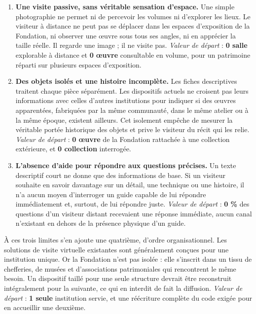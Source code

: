\begin{enumerate}
  \item \textbf{Une visite passive, sans véritable sensation d'espace.} Une
        simple photographie ne permet ni de percevoir les volumes ni d'explorer
        les lieux. Le visiteur à distance ne peut pas se déplacer dans les
        espaces d'exposition de la Fondation, ni observer une œuvre sous tous
        ses angles, ni en apprécier la taille réelle. Il regarde une image ; il
        ne visite pas. \emph{Valeur de départ} : \textbf{0 salle} explorable à
        distance et \textbf{0 œuvre} consultable en volume, pour un patrimoine
        réparti sur plusieurs espaces d'exposition.

  \item \textbf{Des objets isolés et une histoire incomplète.} Les fiches
        descriptives traitent chaque pièce séparément. Les dispositifs actuels
        ne croisent pas leurs informations avec celles d'autres institutions
        pour indiquer si des œuvres apparentées, fabriquées par la même
        communauté, dans le même atelier ou à la même époque, existent
        ailleurs. Cet isolement empêche de mesurer la véritable portée
        historique des objets et prive le visiteur du récit qui les relie.
        \emph{Valeur de départ} : \textbf{0 œuvre} de la Fondation rattachée à
        une collection extérieure, et \textbf{0 collection} interrogée.

  \item \textbf{L'absence d'aide pour répondre aux questions précises.} Un texte
        descriptif court ne donne que des informations de base. Si un visiteur
        souhaite en savoir davantage sur un détail, une technique ou une
        histoire, il n'a aucun moyen d'interroger un guide capable de lui
        répondre immédiatement et, surtout, de lui répondre juste.
        \emph{Valeur de départ} : \textbf{0 \%} des questions d'un visiteur
        distant recevaient une réponse immédiate, aucun canal n'existant en
        dehors de la présence physique d'un guide.
\end{enumerate}

À ces trois limites s'en ajoute une quatrième, d'ordre organisationnel. Les
solutions de visite virtuelle existantes sont généralement conçues pour une
institution unique. Or la Fondation n'est pas isolée : elle s'inscrit dans un
tissu de chefferies, de musées et d'associations patrimoniales qui rencontrent
le même besoin. Un dispositif taillé pour une seule structure devrait être
reconstruit intégralement pour la suivante, ce qui en interdit de fait la
diffusion. \emph{Valeur de départ} : \textbf{1 seule} institution servie, et une
réécriture complète du code exigée pour en accueillir une deuxième.

